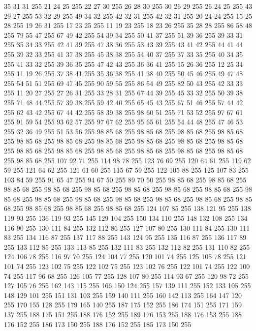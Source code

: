 35 31 31 255 21 24 25 255 22 27 30 255 26 28 30 255 30 26 29 255 26 24 25 255 43 29 27 255 53 32 29 255 49 34 32 255 42 32 31 255 42 32 31 255 20 24 24 255 15 25 28 255 19 26 31 255 17 23 25 255 11 19 23 255 18 23 26 255 35 28 28 255 86 58 48 255 79 55 47 255 67 49 42 255 54 39 34 255 50 41 37 255 51 39 36 255 39 33 31 255 35 34 33 255 42 41 39 255 47 38 36 255 53 43 39 255 43 41 42 255 44 41 44 255 39 32 33 255 41 37 38 255 45 38 38 255 54 40 37 255 37 33 35 255 40 34 35 255 41 33 32 255 39 36 35 255 47 42 43 255 36 36 41 255 15 26 36 255 12 25 34 255 11 19 26 255 37 38 41 255 35 36 38 255 41 38 40 255 50 45 46 255 49 47 48 255 54 51 51 255 69 47 45 255 90 59 55 255 86 54 49 255 82 50 43 255 42 33 33 255 11 20 27 255 27 26 31 255 33 28 31 255 67 44 39 255 45 33 32 255 50 39 38 255 71 48 44 255 57 39 38 255 59 42 40 255
65 45 43 255 67 51 46 255 57 44 42 255 62 43 42 255 67 44 42 255 58 39 38 255 98 60 51 255 71 53 52 255 97 67 61 255 91 59 54 255 93 62 57 255 97 67 62 255 95 65 61 255 54 44 48 255 47 46 53 255 32 36 49 255 51 53 56 255 98 85 68 255 98 85 68 255 98 85 68 255 98 85 68 255 98 85 68 255 98 85 68 255 98 85 68 255 98 85 68 255 98 85 68 255 98 85 68 255 98 85 68 255 98 85 68 255 98 85 68 255 98 85 68 255 98 85 68 255 98 85 68 255 98 85 68 255 107 92 71 255 114 98 78 255 123 76 69 255 120 64 61 255 119 62 59 255 121 64 62 255 121 61 60 255 115 67 59 255 122 105 88 255 125 107 83 255 103 84 59 255 91 65 47 255 94 67 50 255 89 70 50 255 98 85 68 255 98 85 68 255 98 85 68 255 98 85 68 255 98 85 68 255 98 85 68 255 98 85 68 255 98 85 68 255 98 85 68 255 98 85 68 255 98 85 68 255 98 85 68 255 98 85 68 255 98 85 68 255 98 85 68 255 98 85 68 255
98 85 68 255 98 85 68 255 124 107 85 255 138 121 95 255 138 119 93 255 136 119 93 255 145 129 104 255 150 134 110 255 148 132 108 255 134 116 90 255 130 111 84 255 132 112 86 255 127 107 80 255 130 111 84 255 130 111 83 255 134 116 87 255 137 117 88 255 143 124 95 255 135 116 87 255 136 117 89 255 133 112 85 255 133 113 85 255 132 111 83 255 132 112 82 255 131 110 82 255 124 106 78 255 116 97 70 255 124 104 77 255 120 101 74 255 125 105 78 255 121 101 74 255 123 102 75 255 122 102 75 255 123 102 76 255 122 101 74 255 122 100 74 255 117 96 68 255 126 105 77 255 128 107 80 255 114 93 67 255 120 98 72 255 127 105 76 255 162 143 115 255 166 150 124 255 157 139 111 255 152 133 105 255 148 129 101 255 151 131 103 255 159 140 111 255 160 142 113 255 164 147 120 255 170 155 128 255 179 165 140 255 187 175 152 255 186 174 151 255 171 159 137 255 188 175 151 255 188 176 152 255 189 176 153 255 188 176 153 255 188 176 152 255 186 173 150 255 188 176 152 255 185 173 150 255

